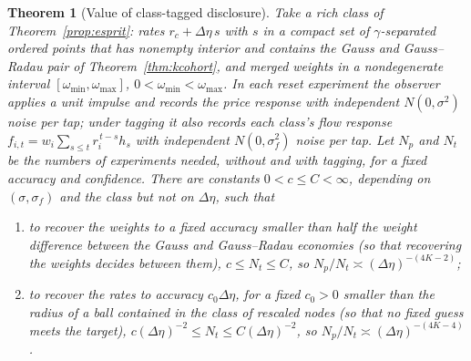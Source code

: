 \documentclass[12pt]{article}
\newtheorem{theorem}{Theorem}[section]
\theoremstyle{definition}
\theoremstyle{remark}
\begin{document}
\begin{theorem}[Value of class-tagged disclosure]\label{thm:discvalue}
Take a rich class of Theorem~\ref{prop:esprit}: rates $r_c+\Delta\eta\,s$ with $s$ in a compact set of $\gamma$-separated ordered points that has nonempty interior and contains the Gauss and Gauss--Radau pair of Theorem~\ref{thm:kcohort}, and merged weights in a nondegenerate interval $[\omega_{\min},\omega_{\max}]$, $0<\omega_{\min}<\omega_{\max}$. In each reset experiment the observer applies a unit impulse and records the price response with independent $N(0,\sigma^2)$ noise per tap; under tagging it also records each class's flow response $f_{i,t}=w_i\sum_{s\le t}r_i^{\,t-s}h_s$ with independent $N(0,\sigma_f^2)$ noise per tap. Let $N_p$ and $N_t$ be the numbers of experiments needed, without and with tagging, for a fixed accuracy and confidence. There are constants $0<c\le C<\infty$, depending on $(\sigma,\sigma_f)$ and the class but not on $\Delta\eta$, such that
\begin{enumerate}[label=(\roman*),itemsep=1pt]
\item to recover the weights to a fixed accuracy smaller than half the weight difference between the Gauss and Gauss--Radau economies (so that recovering the weights decides between them), $c\le N_t\le C$, so $N_p/N_t\asymp(\Delta\eta)^{-(4K-2)}$;
\item to recover the rates to accuracy $c_0\Delta\eta$, for a fixed $c_0>0$ smaller than the radius of a ball contained in the class of rescaled nodes (so that no fixed guess meets the target), $c(\Delta\eta)^{-2}\le N_t\le C(\Delta\eta)^{-2}$, so $N_p/N_t\asymp(\Delta\eta)^{-(4K-4)}$.
\end{enumerate}
\end{theorem}
\end{document}
